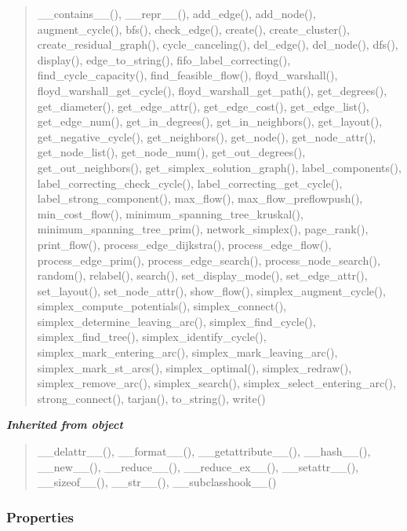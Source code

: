 \begin{quote}
\_\_contains\_\_(), \_\_repr\_\_(), add\_edge(), add\_node(), augment\_cycle(), bfs(), check\_edge(), create(), create\_cluster(), create\_residual\_graph(), cycle\_canceling(), del\_edge(), del\_node(), dfs(), display(), edge\_to\_string(), fifo\_label\_correcting(), find\_cycle\_capacity(), find\_feasible\_flow(), floyd\_warshall(), floyd\_warshall\_get\_cycle(), floyd\_warshall\_get\_path(), get\_degrees(), get\_diameter(), get\_edge\_attr(), get\_edge\_cost(), get\_edge\_list(), get\_edge\_num(), get\_in\_degrees(), get\_in\_neighbors(), get\_layout(), get\_negative\_cycle(), get\_neighbors(), get\_node(), get\_node\_attr(), get\_node\_list(), get\_node\_num(), get\_out\_degrees(), get\_out\_neighbors(), get\_simplex\_solution\_graph(), label\_components(), label\_correcting\_check\_cycle(), label\_correcting\_get\_cycle(), label\_strong\_component(), max\_flow(), max\_flow\_preflowpush(), min\_cost\_flow(), minimum\_spanning\_tree\_kruskal(), minimum\_spanning\_tree\_prim(), network\_simplex(), page\_rank(), print\_flow(), process\_edge\_dijkstra(), process\_edge\_flow(), process\_edge\_prim(), process\_edge\_search(), process\_node\_search(), random(), relabel(), search(), set\_display\_mode(), set\_edge\_attr(), set\_layout(), set\_node\_attr(), show\_flow(), simplex\_augment\_cycle(), simplex\_compute\_potentials(), simplex\_connect(), simplex\_determine\_leaving\_arc(), simplex\_find\_cycle(), simplex\_find\_tree(), simplex\_identify\_cycle(), simplex\_mark\_entering\_arc(), simplex\_mark\_leaving\_arc(), simplex\_mark\_st\_arcs(), simplex\_optimal(), simplex\_redraw(), simplex\_remove\_arc(), simplex\_search(), simplex\_select\_entering\_arc(), strong\_connect(), tarjan(), to\_string(), write()
\end{quote}

\large{\textbf{\textit{Inherited from object}}}

\begin{quote}
\_\_delattr\_\_(), \_\_format\_\_(), \_\_getattribute\_\_(), \_\_hash\_\_(), \_\_new\_\_(), \_\_reduce\_\_(), \_\_reduce\_ex\_\_(), \_\_setattr\_\_(), \_\_sizeof\_\_(), \_\_str\_\_(), \_\_subclasshook\_\_()
\end{quote}


  \subsubsection{Properties}

